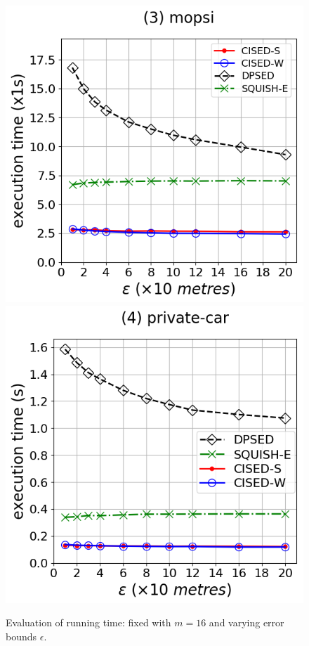 \begin{figure}[tb!]
\includegraphics[scale = 0.30]{Figures/Exp-time-epsilon-mopsi.png}
\includegraphics[scale = 0.30]{Figures/Exp-time-epsilon-private.png}
\vspace{-1ex}
\caption{\small Evaluation of running time: fixed with $m=16$ and varying error bounds $\epsilon$.}
\label{fig:time-epsilon}
\vspace{-1ex}
\end{figure}



